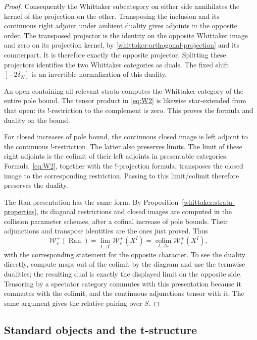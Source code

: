 \begin{proof}
Consequently the Whittaker subcategory on either side annihilates the
kernel of the projection on the other. Transposing the inclusion and its
continuous right adjoint under ambient duality gives adjoints in the
opposite order. The transposed projector is the identity on the opposite
Whittaker image and zero on its projection kernel, by
\eqref{whittaker:orthogonal-projection} and its counterpart. It is
therefore exactly the opposite projector. Splitting these projectors
identifies the two Whittaker categories as duals. The fixed shift
$[-2\delta_N]$ is an invertible normalization of this duality.

An open containing all relevant strata computes the Whittaker category of
the entire pole bound. The tensor product in \eqref{eq:W2} is likewise
star-extended from that open: its $!$-restriction to the complement is
zero. This proves the formula and duality on the bound.

For closed increases of pole bound, the continuous closed image is left
adjoint to the continuous $!$-restriction. The latter also preserves
limits. The limit of these right adjoints is the colimit of their left
adjoints in presentable categories. Formula~\eqref{eq:W2}, together with
the $!$-projection formula, transposes the closed image to the
corresponding restriction. Passing to this limit/colimit therefore
preserves the duality.

The Ran presentation has the same form. By
Proposition~\ref{whittaker:strata-properties}, its diagonal restrictions
and closed images are computed in the collision parameter schemes, after
a cofinal increase of pole bounds. Their adjunctions and transpose
identities are the ones just proved. Thus
\[
 \mathcal W_s^+(\operatorname{Ran})
   =\lim_{I,\,\Delta^!}\mathcal W_s^+(X^I)
   =\operatorname*{colim}_{I,\,\Delta_*}\mathcal W_s^+(X^I),
\]
with the corresponding statement for the opposite character. To see the
duality directly, compute maps out of the colimit by the diagram and use
the termwise dualities; the resulting dual is exactly the displayed
limit on the opposite side. Tensoring by a spectator category commutes
with this presentation because it commutes with the colimit, and the
continuous adjunctions tensor with it. The same argument gives the
relative pairing over $S$.
\end{proof}

\subsection{Standard objects and the t-structure}

